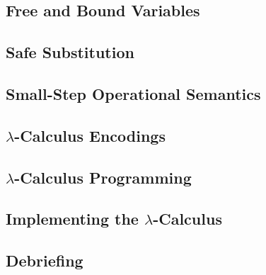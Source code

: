 \documentclass[10pt]{article}
\begin{document}
\subsection*{ Free and Bound Variables}
\subsection*{ Safe Substitution}
\subsection*{ Small-Step Operational Semantics}
\subsection*{ $\lambda$-Calculus Encodings}
\subsection*{ $\lambda$-Calculus Programming}
\subsection*{ Implementing the $\lambda$-Calculus}
\subsection*{ Debriefing}
\end{document}
